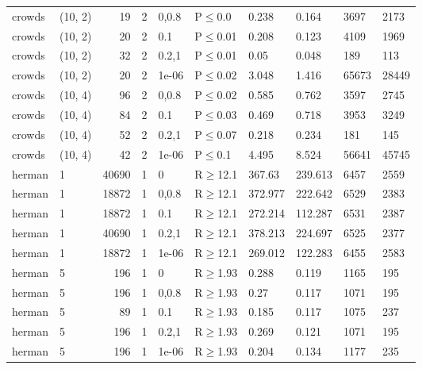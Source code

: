 \begin{longtable}{llrrllllll}
 crowds        & (10, 2)  &     	19 &   2 & 0,0.8 & P$\leq$0.0   & 0.238    & 0.164    & 3697    & 2173    \\
 crowds        & (10, 2)  &     	20 &   2 & 0.1   & P$\leq$0.01  & 0.208    & 0.123    & 4109    & 1969    \\
 crowds        & (10, 2)  &     	32 &   2 & 0.2,1 & P$\leq$0.01  & 0.05     & 0.048    & 189     & 113     \\
 crowds        & (10, 2)  &     	20 &   2 & 1e-06 & P$\leq$0.02  & 3.048    & 1.416    & 65673   & 28449   \\
 crowds        & (10, 4)  &     	96 &   2 & 0,0.8 & P$\leq$0.02  & 0.585    & 0.762    & 3597    & 2745    \\
 crowds        & (10, 4)  &     	84 &   2 & 0.1   & P$\leq$0.03  & 0.469    & 0.718    & 3953    & 3249    \\
 crowds        & (10, 4)  &     	52 &   2 & 0.2,1 & P$\leq$0.07  & 0.218    & 0.234    & 181     & 145     \\
 crowds        & (10, 4)  &     	42 &   2 & 1e-06 & P$\leq$0.1   & 4.495    & 8.524    & 56641   & 45745   \\
 herman        & 1        &  	40690 &   1 & 0     & R$\geq$12.1  & 367.63   & 239.613  & 6457    & 2559    \\
 herman        & 1        &  	18872 &   1 & 0,0.8 & R$\geq$12.1  & 372.977  & 222.642  & 6529    & 2383    \\
 herman        & 1        &  	18872 &   1 & 0.1   & R$\geq$12.1  & 272.214  & 112.287  & 6531    & 2387    \\
 herman        & 1        &  	40690 &   1 & 0.2,1 & R$\geq$12.1  & 378.213  & 224.697  & 6525    & 2377    \\
 herman        & 1        &  	18872 &   1 & 1e-06 & R$\geq$12.1  & 269.012  & 122.283  & 6455    & 2583    \\
 herman        & 5        &    	196 &   1 & 0     & R$\geq$1.93  & 0.288    & 0.119    & 1165    & 195     \\
 herman        & 5        &    	196 &   1 & 0,0.8 & R$\geq$1.93  & 0.27     & 0.117    & 1071    & 195     \\
 herman        & 5        &     	89 &   1 & 0.1   & R$\geq$1.93  & 0.185    & 0.117    & 1075    & 237     \\
 herman        & 5        &    	196 &   1 & 0.2,1 & R$\geq$1.93  & 0.269    & 0.121    & 1071    & 195     \\
 herman        & 5        &    	196 &   1 & 1e-06 & R$\geq$1.93  & 0.204    & 0.134    & 1177    & 235     \\

\end{longtable}
